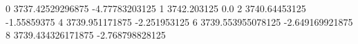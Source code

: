 0 3737.42529296875 -4.77783203125
1 3742.203125 0.0
2 3740.64453125 -1.55859375
4 3739.951171875 -2.251953125
6 3739.553955078125 -2.649169921875
8 3739.434326171875 -2.768798828125
